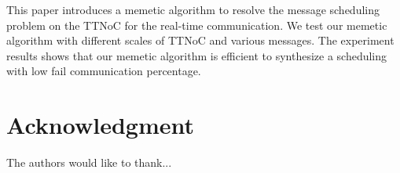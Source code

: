 \documentclass[conference]{IEEEtran}
\begin{document}
This paper introduces a memetic algorithm to resolve the message scheduling problem on the TTNoC for the real-time communication. We test our memetic algorithm with different scales of TTNoC and various messages. The experiment results shows that our memetic algorithm is efficient to synthesize a scheduling with low fail communication percentage.








\section*{Acknowledgment}


The authors would like to thank...







%
%
%




\end{document}
